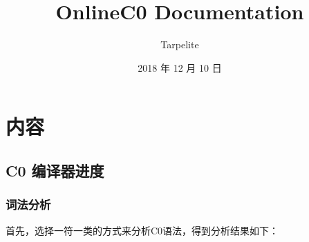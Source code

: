 \documentclass[letterpaper,10pt,english]{sphinxmanual}
\title{OnlineC0 Documentation}
\date{2018 年 12 月 10 日}
\author{Tarpelite}
\begin{document}
\maketitle
\sphinxtableofcontents
{}\label{\detokenize{index::doc}}



\chapter{内容}
\label{\detokenize{index:id1}}\label{\detokenize{index:onlinec0}}

\section{C0 编译器进度}
\label{\detokenize{intro:c0}}\label{\detokenize{intro::doc}}

\subsection{词法分析}
\label{\detokenize{intro:id1}}
首先，选择一符一类的方式来分析C0语法，得到分析结果如下：
\end{document}
